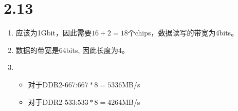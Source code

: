 \documentclass[a4paper,11pt]{article}
\begin{document}
\section{2.13}
\begin{enumerate}
	\item 应该为1Gbit，因此需要$16 + 2 = 18$个chips，数据读写的带宽为4bits。
	\item 数据的带宽是64bits, 因此长度为4。
	\item 
	\begin{itemize}
		\item 对于DDR2-667:$667 * 8 = 5336$MB/s
		\item 对于DDR2-533:$533 * 8 = 4264$MB/s
	\end{itemize}
\end{enumerate}
\end{document}
